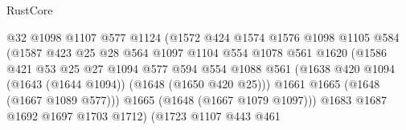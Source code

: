 \begin{lexlean}{RustCore}
\begin{coremodule}
                                      @32
                                      @1098
                                      @1107
                                      @577
                                      @1124
                                      (@1572
                                        @424
                                        @1574
                                        @1576
                                        @1098
                                        @1105
                                        @584
                                        (@1587
                                          @423
                                          @25
                                          @28
                                          @564
                                          @1097
                                          @1104
                                          @554
                                          @1078
                                          @561
                                          @1620
                                          (@1586
                                            @421
                                            @53
                                            @25
                                            @27
                                            @1094
                                            @577
                                            @594
                                            @554
                                            @1088
                                            @561
                                            (@1638
                                              @420
                                              @1094
                                              (@1643 (@1644 @1094))
                                              (@1648 (@1650 @420 @25)))
                                            @1661
                                            @1665
                                            (@1648 (@1667 @1089 @577)))
                                          @1665
                                          (@1648 (@1667 @1079 @1097)))
                                        @1683
                                        @1687
                                        @1692
                                        @1697
                                        @1703
                                        @1712)
                                      (@1723
                                        @1107
                                        @443
                                        @461

\end{coremodule}
\end{lexlean}
